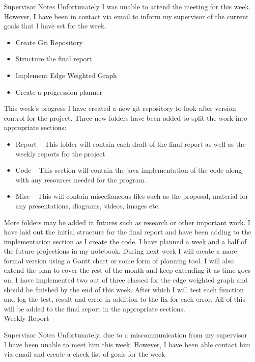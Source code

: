 \documentclass{AISB2008}
\begin{document}
{Supervisor Notes
Unfortunately I was unable to attend the meeting for this week. However, I have been in contact via email to inform my supervisor of the current goals that I have set for the week. 
\begin{itemize}
\item	Create Git Repository
\item	Structure the final report
\item	Implement Edge Weighted Graph
\item Create a progression planner
\end{itemize}
This week’s progress
I have created a new git repository to look after version control for the project. Three new folders have been added to split the work into appropriate sections:
\begin{itemize}
\item	Report – This folder will contain each draft of the final report as well as the weekly reports for the project
\item	Code – This section will contain the java implementation of the code along with any resources needed for the program.
\item	Misc – This will contain miscellaneous files such as the proposal, material for any presentations, diagrams, videos, images etc.
\end{itemize}
More folders may be added in futures such as research or other important work.
I have laid out the initial structure for the final report and have been adding to the implementation section as I create the code.
I have planned a week and a half of the future projections in my notebook. During next week I will create a more formal version using a Gantt chart or some form of planning tool. I will also extend the plan to cover the rest of the month and keep extending it as time goes on.
I have implemented two out of three classed for the edge weighted graph and should be finished by the end of this week. After which I will test each function and log the test, result and error in addition to the fix for each error. All of this will be added to the final report in the appropriate sections.\\



Weekly Report

Supervisor Notes
Unfortunately, due to a miscommunication from my supervisor I have been unable to meet him this week. However, I have been able contact him via email and create a check list of goals for the week

}
\end{document}
